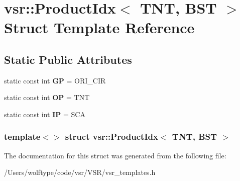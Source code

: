 \hypertarget{structvsr_1_1_product_idx_3_01_t_n_t_00_01_b_s_t_01_4}{\section{vsr\-:\-:Product\-Idx$<$ T\-N\-T, B\-S\-T $>$ Struct Template Reference}
\label{structvsr_1_1_product_idx_3_01_t_n_t_00_01_b_s_t_01_4}
}
\subsection*{Static Public Attributes}
\begin{DoxyCompactItemize}
\item 
\hypertarget{structvsr_1_1_product_idx_3_01_t_n_t_00_01_b_s_t_01_4_a360dfad2e2649cfa5b9bcee513128fad}{static const int {\bfseries G\-P} = O\-R\-I\-\_\-\-C\-I\-R}\label{structvsr_1_1_product_idx_3_01_t_n_t_00_01_b_s_t_01_4_a360dfad2e2649cfa5b9bcee513128fad}

\item 
\hypertarget{structvsr_1_1_product_idx_3_01_t_n_t_00_01_b_s_t_01_4_a30dd1458d15f23e2c18312b0e2004248}{static const int {\bfseries O\-P} = T\-N\-T}\label{structvsr_1_1_product_idx_3_01_t_n_t_00_01_b_s_t_01_4_a30dd1458d15f23e2c18312b0e2004248}

\item 
\hypertarget{structvsr_1_1_product_idx_3_01_t_n_t_00_01_b_s_t_01_4_af8568a36bf70ce177a69a4360d6a197e}{static const int {\bfseries I\-P} = S\-C\-A}\label{structvsr_1_1_product_idx_3_01_t_n_t_00_01_b_s_t_01_4_af8568a36bf70ce177a69a4360d6a197e}

\end{DoxyCompactItemize}
\subsubsection*{template$<$$>$ struct vsr\-::\-Product\-Idx$<$ T\-N\-T, B\-S\-T $>$}



The documentation for this struct was generated from the following file\-:\begin{DoxyCompactItemize}
\item 
/\-Users/wolftype/code/vsr/\-V\-S\-R/vsr\-\_\-templates.\-h\end{DoxyCompactItemize}
